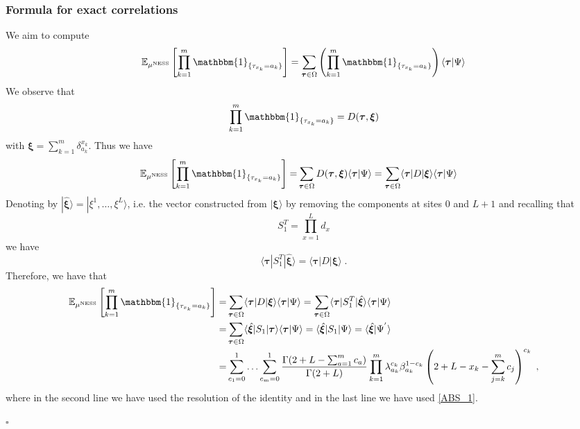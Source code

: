 \documentclass[10pt]{article}
\numberwithin{equation}{section}
\numberwithin{equation}{subsection}
\newcommand{\co}{\;,}
\newcommand{\dt}{\;.}
\begin{document}
\subsubsection{Formula for exact correlations}\label{correlation-section}
We aim to compute
\begin{equation}
	\mathbb{E}_{\mu^{\text{NESS}}}\left[\prod_{k=1}^{m}\mathbbm{1}_{\{\tau_{x_{k}}=a_{k}\}}\right]=\sum_{\bm{\tau}\in \Omega}\left(\prod_{k=1}^{m}\mathbbm{1}_{\{\tau_{x_{k}}=a_{k}\}}\right)\langle\bm{\tau}|\Psi\rangle%
\end{equation}
We observe that 
\begin{equation}
	\prod_{k=1}^{m}\mathbbm{1}_{\{\tau_{x_{k}}=a_{k}\}}=D(\bm{\tau},\bm{\xi})
\end{equation}
with $\bm{\xi}=\sum_{k=1}^{m}\delta_{a_{k}}^{x_{k}}$. Thus we have
\begin{align}
	\mathbb{E}_{\mu^{\text{NESS}}}\left[\prod_{k=1}^{m}\mathbbm{1}_{\{\tau_{x_{k}}=a_{k}\}}\right]=&\sum_{\bm{\tau}\in \Omega}D(\bm{\tau},\bm{\xi})\langle\bm{\tau}|\Psi\rangle
	=\sum_{\bm{\tau}\in \Omega}\langle \bm{\tau}|D|\bm{\xi}\rangle\langle\bm{\tau}|\Psi\rangle
\end{align}
Denoting by $|\hat{\bm{\xi}}\rangle=|\xi^{1},\ldots,\xi^{L}\rangle$, i.e. the vector constructed from $|\bm{\xi}\rangle$ by removing the components at sites $0$ and $L+1$ and recalling that  
\begin{equation}
	S_{1}^{T}=\prod_{x=1}^{L}d_{x}
\end{equation} 
we have
\begin{equation}
	\langle \bm{\tau}|S_{1}^{T}|\hat{\bm{\xi}}\rangle=\langle \bm{\tau}|D|\bm{\xi}\rangle \dt
\end{equation}
Therefore, we have that 
\begin{align}
	\mathbb{E}_{\mu^{\text{NESS}}}\left[\prod_{k=1}^{m}\mathbbm{1}_{\{\tau_{x_{k}}=a_{k}\}}\right]=& \sum_{\bm{\tau}\in \Omega}\langle \bm{\tau}|D|\bm{\xi}\rangle\langle\bm{\tau}|\Psi\rangle
	=\sum_{\bm{\tau}\in \Omega}\langle \bm{\tau}|S_{1}^{T}|\hat{\bm{\xi}}\rangle\langle\bm{\tau}|\Psi\rangle\nonumber\\
	=&\sum_{\bm{\tau}\in \Omega}\langle \hat{\bm{\xi}}|S_{1}|\bm{\tau}\rangle\langle\bm{\tau}|\Psi\rangle
	=\langle \hat{\bm{\xi}}|S_{1}|\Psi\rangle
	=\langle \hat{\bm{\xi}}|\Psi^{'}\rangle\nonumber\\
	=&\sum_{c_{1}=0}^{1}\ldots\sum_{c_{m}=0}^{1}\frac{\Gamma(2+L-\sum_{a=1}^{m}c_{a})}{\Gamma(2+L)}\prod_{k=1}^{m}\lambda_{a_{k}}^{c_{k}}\beta_{a_{k}}^{1-c_{k}}\left(2+L-x_{k}-\sum_{j=k}^{m}c_{j}\right)^{c_{k}}\co
\end{align}
where in the second line we have used the resolution of the identity and in the last line we have used \eqref{ABS_1}. 
\begin{flushright}
	$\square$
\end{flushright}
\end{document}
